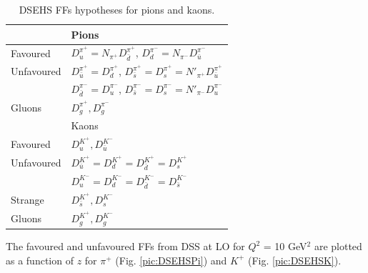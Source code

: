 \begin{table}[!h]
  \caption{DSEHS FFs hypotheses for pions and kaons.}
  \label{tab:DSEHSParametrization}
  \centering
  \begin{tabular}{ll}
    \hline
    \hline
     & Pions \\
    \hline
    Favoured & $D^{\pi^{+}}_{u} = N_{\pi^{+}} D^{\pi^{+}}_{\bar{d}}$, $D^{\pi^{-}}_{d} = N_{\pi^{-}} D^{\pi^{-}}_{\bar{u}}$ \\
    Unfavoured & $D^{\pi^{+}}_{\bar{u}} = D^{\pi^{+}}_{d}$, $D^{\pi^{+}}_{\bar{s}} = D^{\pi^{+}}_{s} = N'_{\pi^{+}} D^{\pi^{+}}_{\bar{u}}$ \\
     & $D^{\pi^{-}}_{\bar{d}} = D^{\pi^{-}}_{u}$, $D^{\pi^{-}}_{\bar{s}} = D^{\pi^{-}}_{s} = N'_{\pi^{-}} D^{\pi^{-}}_{u}$ \\
    Gluons & $D^{\pi^{+}}_{g}, D^{\pi^{-}}_{g}$ \\
    \hline
    \hline
     & Kaons \\
    \hline
    Favoured & $D^{K^{+}}_{u}, D^{K^{-}}_{\bar{u}}$ \\
    Unfavoured & $D^{K^{+}}_{\bar{u}} = D^{K^{+}}_{d} = D^{K^{+}}_{\bar{d}} = D^{K^{+}}_{s}$ \\
               & $D^{K^{-}}_{u} = D^{K^{-}}_{d} = D^{K^{-}}_{\bar{d}} = D^{K^{-}}_{\bar{s}}$ \\
    Strange & $D^{K^{+}}_{\bar{s}}, D^{K^{-}}_{s}$ \\
    Gluons & $D^{K^{+}}_{g}, D^{K^{-}}_{g}$ \\
  \end{tabular}
\end{table}

The favoured and unfavoured FFs from DSS at LO for $Q^2$ = 10 GeV$^2$ are plotted as a function of $z$ for $\pi^+$ (Fig. \ref{pic:DSEHSPi}) and $K^+$ (Fig. \ref{pic:DSEHSK}).

